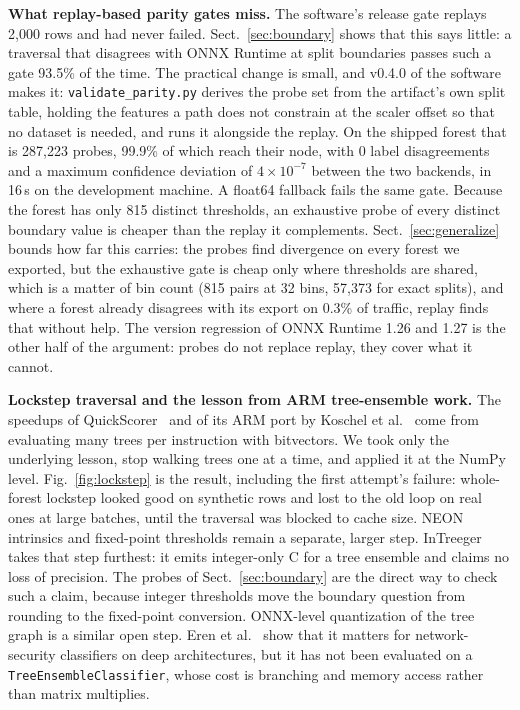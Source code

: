 \documentclass[runningheads]{llncs}
\begin{document}
\textbf{What replay-based parity gates miss.} The software's release gate replays 2{,}000 rows and had never failed. Sect.~\ref{sec:boundary} shows that this says little: a traversal that disagrees with ONNX Runtime at split boundaries passes such a gate 93.5\% of the time. The practical change is small, and v0.4.0 of the software makes it: \texttt{validate\_parity.py} derives the probe set from the artifact's own split table, holding the features a path does not constrain at the scaler offset so that no dataset is needed, and runs it alongside the replay. On the shipped forest that is 287{,}223 probes, 99.9\% of which reach their node, with 0 label disagreements and a maximum confidence deviation of $4\times10^{-7}$ between the two backends, in 16\,s on the development machine. A float64 fallback fails the same gate. Because the forest has only 815 distinct thresholds, an exhaustive probe of every distinct boundary value is cheaper than the replay it complements. Sect.~\ref{sec:generalize} bounds how far this carries: the probes find divergence on every forest we exported, but the exhaustive gate is cheap only where thresholds are shared, which is a matter of bin count (815 pairs at 32 bins, 57{,}373 for exact splits), and where a forest already disagrees with its export on 0.3\% of traffic, replay finds that without help. The version regression of ONNX Runtime 1.26 and 1.27 is the other half of the argument: probes do not replace replay, they cover what it cannot.

\textbf{Lockstep traversal and the lesson from ARM tree-ensemble work.} The speedups of QuickScorer~\cite{lucchese2015quickscorer} and of its ARM port by Koschel et al.~\cite{koschel2023arm} come from evaluating many trees per instruction with bitvectors. We took only the underlying lesson, stop walking trees one at a time, and applied it at the NumPy level. Fig.~\ref{fig:lockstep} is the result, including the first attempt's failure: whole-forest lockstep looked good on synthetic rows and lost to the old loop on real ones at large batches, until the traversal was blocked to cache size. NEON intrinsics and fixed-point thresholds remain a separate, larger step. InTreeger~\cite{bart2025intreeger} takes that step furthest: it emits integer-only C for a tree ensemble and claims no loss of precision. The probes of Sect.~\ref{sec:boundary} are the direct way to check such a claim, because integer thresholds move the boundary question from rounding to the fixed-point conversion. ONNX-level quantization of the tree graph is a similar open step. Eren et al.~\cite{eren2026drdos} show that it matters for network-security classifiers on deep architectures, but it has not been evaluated on a \texttt{TreeEnsembleClassifier}, whose cost is branching and memory access rather than matrix multiplies.
\end{document}
